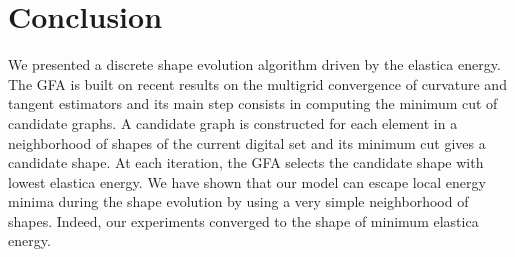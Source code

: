 \documentclass{siamart220329}
\begin{document}

%
%
%
%
%
%
\section{Conclusion}
%
%
We presented a discrete shape evolution algorithm driven by the elastica energy.
The GFA is built on recent results on the multigrid convergence of curvature and
tangent estimators and its main step consists in computing the minimum cut of
candidate graphs. A candidate graph is constructed for each element in a
neighborhood of shapes of the current digital set and its minimum cut gives a
candidate shape. At each iteration, the GFA selects the candidate shape with
lowest elastica energy. We have shown that our model can escape local energy
minima during the shape evolution by using a very simple neighborhood of shapes.
Indeed, our experiments converged to the shape of minimum elastica energy. 
\end{document}
